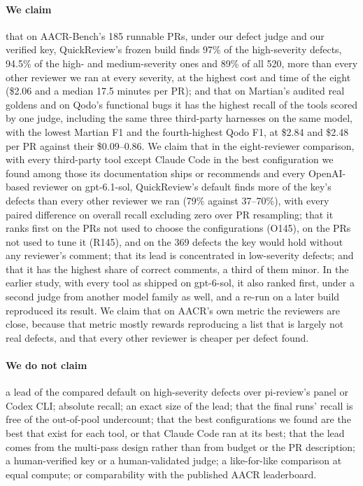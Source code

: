 \documentclass[11pt,a4paper]{article}
\newcommand{\qcr}{QuickReview}
\begin{document}
\paragraph{We claim} that on AACR-Bench's 185 runnable PRs, under our
defect judge and our verified key, \qcr{}'s frozen build finds 97\% of the
high-severity defects, 94.5\% of the high- and medium-severity ones and 89\%
of all 520, more than every other reviewer we ran at every severity, at the
highest cost and time of the eight (\$2.06 and a median 17.5 minutes per
PR); and that on Martian's audited real goldens and on Qodo's functional
bugs it has the highest recall of the tools scored by one judge, including
the same three third-party harnesses on the same model, with the lowest
Martian F1 and the fourth-highest Qodo F1, at \$2.84 and \$2.48 per PR
against their \$0.09--0.86. We claim that in the
eight-reviewer comparison, with every third-party tool except Claude Code in
the best configuration we found among those its documentation ships or
recommends and every OpenAI-based reviewer on gpt-6.1-sol, \qcr{}'s default
finds more of the key's defects than every other reviewer we ran (79\%
against 37--70\%), with every paired difference on overall recall excluding
zero over PR resampling; that it ranks first on the PRs not used to
choose the configurations (O145), on the PRs not used to tune it (R145), and
on the 369 defects the key would hold without any reviewer's comment; that
its lead is concentrated in low-severity defects; and that it has the highest
share of correct comments, a third of them minor. In the earlier study, with
every tool as shipped on gpt-6-sol, it also ranked first, under a second
judge from another model family as well, and a re-run on a later build
reproduced its result. We claim that on AACR's own metric the reviewers are
close, because that metric mostly rewards reproducing a list that is largely
not real defects, and that every other reviewer is cheaper per defect found.

\paragraph{We do not claim} a lead of the compared default on high-severity
defects over pi-review's panel or Codex CLI; absolute recall; an exact size
of the lead; that the final runs' recall is free of the out-of-pool undercount; that the best
configurations we found are the best that exist for each tool, or that
Claude Code ran at its best; that the lead comes from the multi-pass design
rather than from budget or the PR description; a human-verified key or a
human-validated judge; a like-for-like comparison at equal compute; or
comparability with the published AACR leaderboard.
\end{document}
